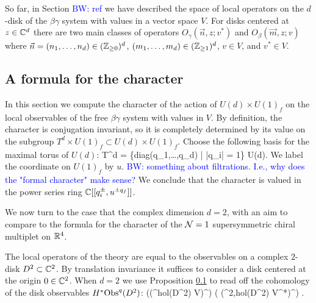 \documentclass[10pt]{amsart}
\def\brian{\textcolor{blue}{BW: }\textcolor{blue}}
\begin{document}
So far, in Section \brian{ref} we have described the space of local operators on the $d$-disk of the $\beta\gamma$ system with values in a vector space $V$. 
For disks centered at $z \in \mathbb C^d$ there are two main classes of operators $O_\gamma (\vec{n}, z ; v^*)$ and $O_{\beta}(\vec{m}, z ; v)$ where $\vec{n} = (n_1,\ldots,n_d) \in (\mathbb Z_{\geq 0})^d$, $(m_1,\ldots,m_d) \in (\mathbb Z_{\geq 1})^d$, $v \in V$, and $v^* \in V$. 

\subsection{A formula for the character}

In this section we compute the character of the action of $U(d) \times U(1)_f$ on the local observables of the free $\beta\gamma$ system with values in $V$. 
By definition, the character is conjugation invariant, so it is completely determined by its value on the subgroup $T^d \times U(1)_f \subset U(d) \times U(1)_f$. 
Choose the following basis for the maximal torus of $U(d)$: 
\ben
T^d = \{{\rm diag}(q_1,\ldots,q_d) \; | \; |q_i| = 1\} \subset U(d).
\een 
We label the coordinate on $U(1)_f$ by $u$. 
\brian{something about filtrations. I.e., why does the "formal character" make sense?} 
We conclude that the character is valued in the power series ring $\mathbb C[[q_i^{\pm}, u^{\pm q_f}]]$. 

We now turn to the case that the complex dimension $d = 2$, with an aim to compare to the formula for the character of the $\mathcal N = 1$ supersymmetric chiral multiplet on $\mathbb R^4$. 

The local operators of the theory are equal to the observables on a complex $2$-disk $D^2 \subset \mathbb C^2$. 
By translation invariance it suffices to consider a disk centered at the origin $0 \in \mathbb C^2$. 
When $d=2$ we use Proposition \ref{} to read off the cohomology of the disk observables $H^*{\rm Obs}^q (D^2)$:
\ben
\Sym\left((\sO^{hol}(D^2) \tensor V)^\vee \right) \tensor \Sym \left( (\Omega^{2,hol}(D^2) \tensor V^*)^\vee [-1] \right) .
\een 
\end{document}
